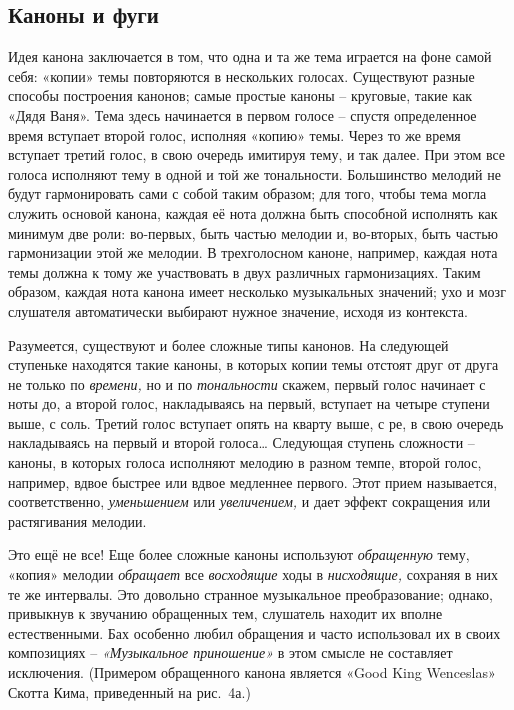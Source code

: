 \documentclass[../main.tex]{subfiles}
\begin{document}
\subsection{Каноны и фуги}

Идея канона заключается в том, что одна и та же тема играется на фоне самой себя: «копии» темы повторяются в нескольких голосах. Существуют разные способы построения канонов; самые простые каноны \--- круговые, такие как «Дядя Ваня». Тема здесь начинается в первом голосе \--- спустя определенное время вступает второй голос, исполняя «копию» темы. Через то же время вступает третий голос, в свою очередь имитируя тему, и так далее. При этом все голоса исполняют тему в одной и той же тональности. Большинство мелодий не будут гармонировать сами с собой таким образом; для того, чтобы тема могла служить основой канона, каждая её нота должна быть способной исполнять как минимум две роли: во-первых, быть частью мелодии и, во-вторых, быть частью гармонизации этой же мелодии. В трехголосном каноне, например, каждая нота темы должна к тому же участвовать в двух различных гармонизациях. Таким образом, каждая нота канона имеет несколько музыкальных значений; ухо и мозг слушателя автоматически выбирают нужное значение, исходя из контекста.

Разумеется, существуют и более сложные типы канонов. На следующей ступеньке находятся такие каноны, в которых копии темы отстоят друг от друга не только по \emph{времени,} но и по \emph{тональности} скажем, первый голос начинает с ноты до, а второй голос, накладываясь на первый, вступает на четыре ступени выше, с соль. Третий голос вступает опять на кварту выше, с ре, в свою очередь накладываясь на первый и второй голоса\ldots{} Следующая ступень сложности \--- каноны, в которых голоса исполняют мелодию в разном темпе, второй голос, например, вдвое быстрее или вдвое медленнее первого. Этот прием называется, соответственно, \emph{уменьшением} или \emph{увеличением,} и дает эффект сокращения или растягивания мелодии.

Это ещё не все! Еще более сложные каноны используют \emph{обращенную} тему, «копия» мелодии \emph{обращает} все \emph{восходящие} ходы в \emph{нисходящие,} сохраняя в них те же интервалы. Это довольно странное музыкальное преобразование; однако, привыкнув к звучанию обращенных тем, слушатель находит их вполне естественными. Бах особенно любил обращения и часто использовал их в своих композициях \--- \emph{«Музыкальное приношение»} в этом смысле не составляет исключения. (Примером обращенного канона является «Good King Wenceslas» Скотта Кима, приведенный на рис.~4а.)
\end{document}
